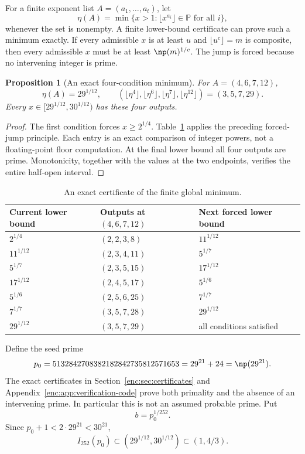 \documentclass[11pt,a4paper]{article}
\newtheorem{proposition}[theorem]{Proposition}
\theoremstyle{definition}
\theoremstyle{remark}
\numberwithin{equation}{section}
\begin{document}
For a finite exponent list $A=(a_1,\ldots,a_t)$, let
\[
\eta(A)=\min\{x>1:\lfloor x^{a_i}\rfloor\in\mathbb P\text{ for all }i\},
\]
whenever the set is nonempty. A finite lower-bound certificate can prove such a minimum exactly. If every admissible $x$ is at least $u$ and $\lfloor u^c\rfloor=m$ is composite, then every admissible $x$ must be at least $\np(m)^{1/c}$. The jump is forced because no intervening integer is prime.

\begin{proposition}[An exact four-condition minimum]\label{enc:prop:finite-minimum}
For $A=(4,6,7,12)$,
\[
\eta(A)=29^{1/12},\qquad
(\lfloor\eta^4\rfloor,\lfloor\eta^6\rfloor,
\lfloor\eta^7\rfloor,\lfloor\eta^{12}\rfloor)=(3,5,7,29).
\]
Every $x\in[29^{1/12},30^{1/12})$ has these four outputs.
\end{proposition}
\begin{proof}
The first condition forces $x\ge2^{1/4}$. Table~\ref{enc:tab:jumps} applies the preceding forced-jump principle. Each entry is an exact comparison of integer powers, not a floating-point floor computation. At the final lower bound all four outputs are prime. Monotonicity, together with the values at the two endpoints, verifies the entire half-open interval.
\end{proof}

\begin{table}[htbp]
\centering
\caption{An exact certificate of the finite global minimum.}\label{enc:tab:jumps}
\begin{tabular}{@{}lll@{}}\toprule
Current lower bound & Outputs at $(4,6,7,12)$ & Next forced lower bound\\\midrule
$2^{1/4}$ & $(2,2,3,8)$ & $11^{1/12}$\\
$11^{1/12}$ & $(2,3,4,11)$ & $5^{1/7}$\\
$5^{1/7}$ & $(2,3,5,15)$ & $17^{1/12}$\\
$17^{1/12}$ & $(2,4,5,17)$ & $5^{1/6}$\\
$5^{1/6}$ & $(2,5,6,25)$ & $7^{1/7}$\\
$7^{1/7}$ & $(3,5,7,28)$ & $29^{1/12}$\\
$29^{1/12}$ & $(3,5,7,29)$ & all conditions satisfied\\\bottomrule
\end{tabular}
\end{table}

Define the seed prime
\begin{equation}\label{enc:eq:seedprime}
p_0=5132842708382182842735812571653
=29^{21}+24=\np(29^{21}).
\end{equation}
The exact certificates in Section~\ref{enc:sec:certificates} and Appendix~\ref{enc:app:verification-code} prove both primality and the absence of an intervening prime. In particular this is not an assumed probable prime. Put
\[
b=p_0^{1/252}.
\]
Since $p_0+1<2\cdot29^{21}<30^{21}$,
\begin{equation}\label{enc:eq:seed-cell}
I_{252}(p_0)\subset(29^{1/12},30^{1/12})\subset(1,4/3).
\end{equation}
\end{document}
